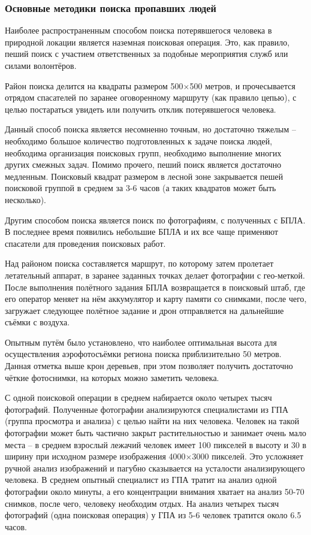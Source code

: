 \subsubsection{Основные методики поиска пропавших людей}

Наиболее распространенным способом поиска потерявшегося человека в природной локации является наземная поисковая операция. Это, как правило, пеший поиск с участием ответственных за подобные мероприятия служб или силами волонтёров. 

Район поиска делится на квадраты размером 500$\times$500 метров, и прочесывается отрядом спасателей по заранее оговоренному маршруту (как правило цепью), с целью постараться увидеть или получить отклик потерявшегося человека. 

Данный способ поиска является несомненно точным, но достаточно тяжелым -- необходимо большое количество подготовленных к задаче поиска людей, необходима организация поисковых групп, необходимо выполнение многих других смежных задач. Помимо прочего, пеший поиск является достаточно медленным. Поисковый квадрат размером в лесной зоне закрывается пешей поисковой группой в среднем за 3-6 часов (а таких квадратов может быть несколько).

Другим способом поиска является поиск по фотографиям, с полученных с БПЛА. В последнее время появились небольшие БПЛА и их все чаще применяют спасатели для проведения поисковых работ. 

Над районом поиска составляется маршрут, по которому затем пролетает летательный аппарат, в заранее заданных точках делает фотографии с гео-меткой. После выполнения полётного задания БПЛА возвращается в поисковый штаб, где его оператор меняет на нём аккумулятор и карту памяти со снимками, после чего, загружает следующее полётное задание и дрон отправляется на дальнейшие съёмки с воздуха.

Опытным путём было установлено, что наиболее оптимальная высота для осуществления аэрофотосъёмки региона поиска приблизительно 50 метров. Данная отметка выше крон деревьев, при этом позволяет получить достаточно чёткие фотоснимки, на которых можно заметить человека.

С одной поисковой операции в среднем набирается около четырех тысяч фотографий. Полученные фотографии анализируются специалистами из ГПА (группа просмотра и анализа) с целью найти на них человека. Человек на такой фотографии может быть частично закрыт растительностью и занимает очень мало места -- в среднем взрослый лежачий человек имеет 100 пикселей в высоту и 30 в ширину при исходном размере изображения 4000$\times$3000 пикселей. Это усложняет ручной анализ изображений и пагубно сказывается на усталости анализирующего человека. В среднем опытный специалист из ГПА тратит на анализ одной фотографии около минуты, а его концентрации внимания хватает на анализ 50-70 снимков, после чего, человеку необходим отдых. На анализ четырех тысяч фотографий (одна поисковая операция) у ГПА из 5-6 человек тратится около 6.5 часов.